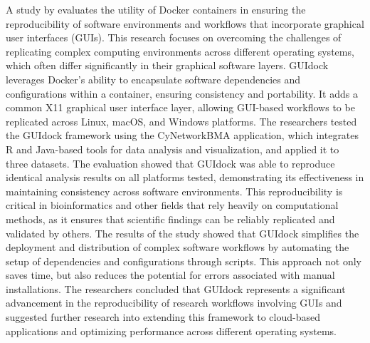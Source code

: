 A study by \citet{hungGUIdockUsingDocker2016} evaluates the utility of Docker containers in ensuring the reproducibility of software environments and workflows that incorporate graphical user interfaces (GUIs).
This research focuses on overcoming the challenges of replicating complex computing environments across different operating systems, which often differ significantly in their graphical software layers.
GUIdock leverages Docker's ability to encapsulate software dependencies and configurations within a container, ensuring consistency and portability.
It adds a common X11 graphical user interface layer, allowing GUI-based workflows to be replicated across Linux, macOS, and Windows platforms.
The researchers tested the GUIdock framework using the CyNetworkBMA application, which integrates R and Java-based tools for data analysis and visualization, and applied it to three datasets.
The evaluation showed that GUIdock was able to reproduce identical analysis results on all platforms tested, demonstrating its effectiveness in maintaining consistency across software environments.
This reproducibility is critical in bioinformatics and other fields that rely heavily on computational methods, as it ensures that scientific findings can be reliably replicated and validated by others.
The results of the study showed that GUIdock simplifies the deployment and distribution of complex software workflows by automating the setup of dependencies and configurations through scripts.
This approach not only saves time, but also reduces the potential for errors associated with manual installations.
The researchers concluded that GUIdock represents a significant advancement in the reproducibility of research workflows involving GUIs and suggested further research into extending this framework to cloud-based applications and optimizing performance across different operating systems.

